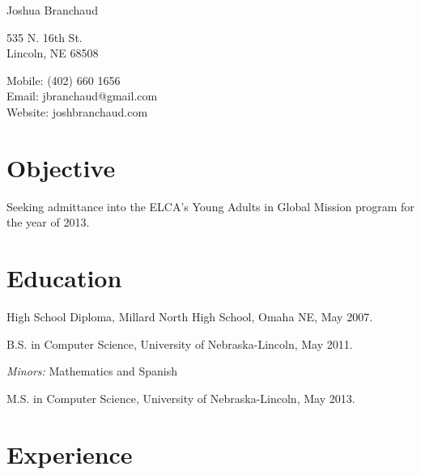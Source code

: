 \documentclass[10pt,letterpaper]{article}
\def\name{Joshua Branchaud}
\renewenvironment{itemize}{
  \begin{list}{}{
    \setlength{\leftmargin}{1.5em}
    \setlength{\itemsep}{0.25em}
    \setlength{\parskip}{0pt}
    \setlength{\parsep}{0.25em}
  }
}{
  \end{list}
}
\begin{document}
{\huge \name}


\vspace{0.25in}

\begin{minipage}[t]{0.5\textwidth}
  535 N. 16th St. \\
  Lincoln, NE 68508
\end{minipage}
\begin{minipage}[t]{0.5\textwidth}
  Mobile: (402) 660 1656 \\
  Email: jbranchaud@gmail.com \\
  Website: joshbranchaud.com \\
\end{minipage}

\section*{Objective}

\begin{itemize}
    \item Seeking admittance into the ELCA's Young Adults in Global Mission
        program for the year of 2013.
\end{itemize}

\section*{Education}

\begin{itemize}
  \item High School Diploma, Millard North High School, Omaha NE, May 2007.

  \item B.S. in Computer Science, University of Nebraska-Lincoln, May 2011.

    \begin{itemize}
        \item \textit{Minors:} Mathematics and Spanish
    \end{itemize}
    
    \item M.S. in Computer Science, University of Nebraska-Lincoln, May 2013.

\end{itemize}

\section*{Experience}
\end{document}
